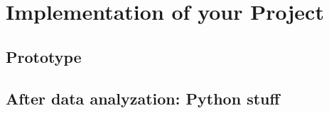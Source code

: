 \chapter{Implementation of your Project}
\label{ch:Implementation}

\section{Prototype}

\section{After data analyzation: Python stuff}